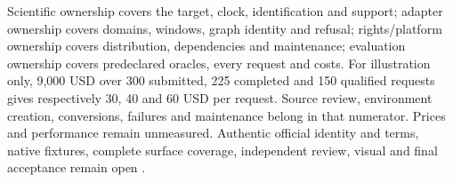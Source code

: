 Scientific ownership covers the target, clock, identification and support;
adapter ownership covers domains, windows, graph identity and refusal;
rights/platform ownership covers distribution, dependencies and maintenance;
evaluation ownership covers predeclared oracles, every request and costs.
For illustration only, 9,000 USD over 300 submitted, 225 completed and
150 qualified requests gives respectively 30, 40 and 60 USD per request.
Source review, environment creation, conversions, failures and maintenance
belong in that numerator. Prices and performance remain unmeasured.
Authentic official identity and terms, native fixtures, complete surface
coverage, independent review, visual and final acceptance remain open
\cite{exec24_banjo_choice}.
